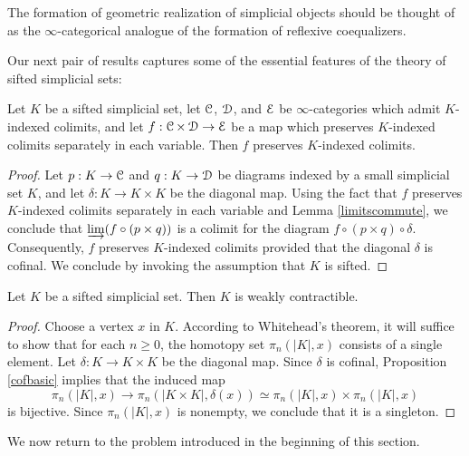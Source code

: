 \begin{remark}
The formation of geometric realization of simplicial objects should be thought of as the $\infty$-categorical analogue of the formation of reflexive coequalizers.
\end{remark}

Our next pair of results captures some of the essential features of the theory of sifted simplicial sets:

\begin{proposition}\label{urbil}
Let $K$ be a sifted simplicial set, let
$\operatorname{\mathcal{C}}$, $\operatorname{\mathcal{D}}$, and $\operatorname{\mathcal{E}}$ be $\infty$-categories which admit $K$-indexed colimits, and let
$f: \operatorname{\mathcal{C}} \times \operatorname{\mathcal{D}} \rightarrow \operatorname{\mathcal{E}}$ be a map which preserves $K$-indexed colimits separately in each variable. Then $f$ preserves $K$-indexed colimits. 
\end{proposition}

\begin{proof}
Let $p: K \rightarrow \operatorname{\mathcal{C}}$ and $q: K \rightarrow \operatorname{\mathcal{D}}$ be diagrams indexed by a small simplicial set $K$, and let $\delta: K \rightarrow K \times K$ be the diagonal map. Using the fact that 
$f$ preserves $K$-indexed colimits separately in each variable and Lemma \ref{limitscommute}, we conclude that $\operatorname{\varinjlim}( f \circ (p \times q) )$ is a colimit for the diagram $f \circ (p \times q) \circ \delta$. Consequently, $f$ preserves $K$-indexed colimits provided that the diagonal $\delta$ is cofinal. We conclude by invoking the assumption that $K$ is sifted.
\end{proof}

\begin{proposition}\label{siftcont}
Let $K$ be a sifted simplicial set. Then $K$ is weakly contractible.
\end{proposition}

\begin{proof}
Choose a vertex $x$ in $K$. According to Whitehead's theorem, it will suffice to show that for each
$n \geq 0$, the homotopy set $\pi_n( |K|,x)$ consists of a single element. Let $\delta: K \rightarrow K \times K$ be the diagonal map. Since $\delta$ is cofinal, Proposition \ref{cofbasic} implies that
the induced map
$$ \pi_n( |K|, x) \rightarrow \pi_n( |K \times K|, \delta(x) ) \simeq \pi_n(|K|,x) \times \pi_n(|K|,x)$$
is bijective. Since $\pi_n( |K|,x)$ is nonempty, we conclude that it is a singleton.
\end{proof}

We now return to the problem introduced in the beginning of this section.

